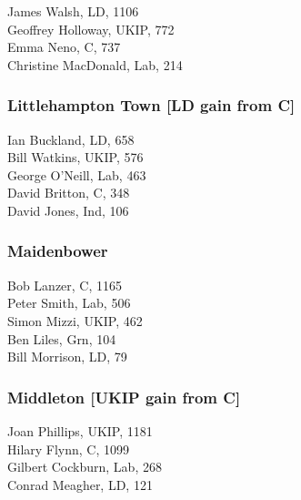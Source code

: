 \documentclass[a4paper,openany,10pt]{book}
\begin{document}
James Walsh, LD, 1106\\
Geoffrey Holloway, UKIP, 772\\
Emma Neno, C, 737\\
Christine MacDonald, Lab, 214\\


\subsubsection*{Littlehampton Town \hspace*{\fill}\nolinebreak[1]%
\enspace\hspace*{\fill}
[LD gain from C]}



Ian Buckland, LD, 658\\
Bill Watkins, UKIP, 576\\
George O'Neill, Lab, 463\\
David Britton, C, 348\\
David Jones, Ind, 106\\


\subsubsection*{Maidenbower}



Bob Lanzer, C, 1165\\
Peter Smith, Lab, 506\\
Simon Mizzi, UKIP, 462\\
Ben Liles, Grn, 104\\
Bill Morrison, LD, 79\\


\subsubsection*{Middleton \hspace*{\fill}\nolinebreak[1]%
\enspace\hspace*{\fill}
[UKIP gain from C]}



Joan Phillips, UKIP, 1181\\
Hilary Flynn, C, 1099\\
Gilbert Cockburn, Lab, 268\\
Conrad Meagher, LD, 121\\
\end{document}
